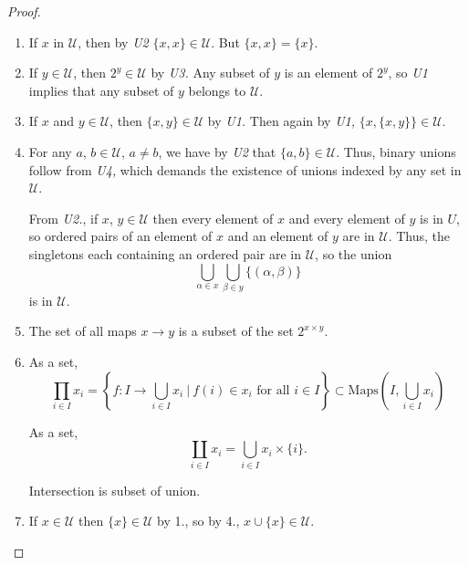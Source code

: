 \documentclass[notes.tex]{subfiles}
\begin{document}
\begin{proof}
  \leavevmode
  \begin{enumerate}
    \item If $x$ in $\mathcal{U}$, then by \emph{U2} $\{x, x\} \in \mathcal{U}$. But $\{x, x\} = \{x\}$.

    \item If $y \in \mathcal{U}$, then $2^{y} \in \mathcal{U}$ by \emph{U3.} Any subset of $y$ is an element of $2^{y}$, so \emph{U1} implies that any subset of $y$ belongs to $\mathcal{U}$.

    \item If $x$ and $y \in \mathcal{U}$, then $\{x, y\} \in \mathcal{U}$ by \emph{U1.} Then again by \emph{U1,} $\{x, \{x, y\}\} \in \mathcal{U}$.

    \item For any $a$, $b \in \mathcal{U}$, $a \neq b$, we have by \emph{U2} that $\{a, b\} \in \mathcal{U}$. Thus, binary unions follow from \emph{U4,} which demands the existence of unions indexed by any set in $\mathcal{U}$. 
      
      From \emph{U2.}, if $x$, $y \in \mathcal{U}$ then every element of $x$ and every element of $y$ is in $U$, so ordered pairs of an element of $x$ and an element of $y$ are in $\mathcal{U}$. Thus, the singletons each containing an ordered pair are in $\mathcal{U}$, so the union
      \begin{equation*}
        \bigcup_{\alpha \in x} \bigcup_{\beta \in y} \{(\alpha, \beta)\}
      \end{equation*}
      is in $\mathcal{U}$.

    \item The set of all maps $x \to y$ is a subset of the set $2^{x \times y}$.

    \item As a set, 
      \begin{equation*}
        \prod_{i \in I} x_{i} = \left\{f\colon I \to \bigcup_{i \in I} x_{i}\ \Big|\ f(i) \in x_{i} \text{ for all }i \in I\right\} \subset \mathrm{Maps}\left(I, \bigcup_{i \in I} x_{i}\right)
      \end{equation*}

      As a set,
      \begin{equation*}
        \coprod_{i \in I} x_{i} = \bigcup_{i \in I} x_{i} \times \{i\}.
      \end{equation*}

      Intersection is subset of union.

    \item If $x \in \mathcal{U}$ then $\{x\} \in \mathcal{U}$ by 1., so by 4., $x \cup \{x\} \in \mathcal{U}$.
  \end{enumerate}
\end{proof}
\end{document}
